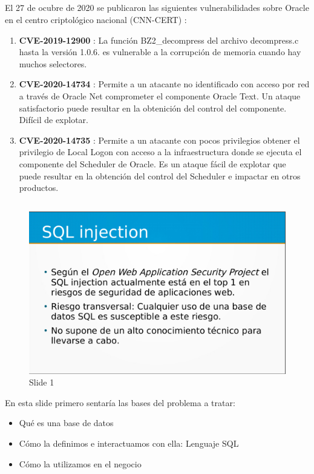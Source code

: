 \documentclass[a4paper,oneside]{article}
\begin{document}
\subsection{}
El 27 de ocubre de 2020 se publicaron las siguientes vulnerabilidades sobre Oracle en el centro criptológico nacional (CNN-CERT) \cite{ccncert}:
\begin{enumerate}
\item \textbf{CVE-2019-12900} \cite{CVE-2019-12900}: La función BZ2\_decompress del archivo decompress.c hasta la versión 1.0.6. es vulnerable a la corrupción de memoria cuando hay muchos selectores.
\item \textbf{CVE-2020-14734} \cite{CVE-2020-14734}: Permite a un atacante no identificado con acceso por red a través de Oracle Net comprometer el componente Oracle Text. Un ataque satisfactorio puede resultar en la obtenición del control del componente. Difícil de explotar.
\item \textbf{CVE-2020-14735} \cite{CVE-2020-14735}: Permite a un atacante con pocos privilegios obtener el privilegio de Local Logon con acceso a la infraestructura donde se ejecuta el componente del Scheduler de Oracle. Es un ataque fácil de explotar que puede resultar en la obtención del control del Scheduler e impactar en otros productos.
\end{enumerate}

\subsection{}

\begin{figure}[h!]
  \centering
  \includegraphics[scale=0.3]{images/1.png}
  \caption{Slide 1}
  \label{fig:1}
\end{figure}
En esta slide primero sentaría las bases del problema a tratar:
\begin{itemize}
\item Qué es una base de datos
\item Cómo la definimos e interactuamos con ella: Lenguaje SQL
\item Cómo la utilizamos en el negocio
\end{itemize}
\end{document}
